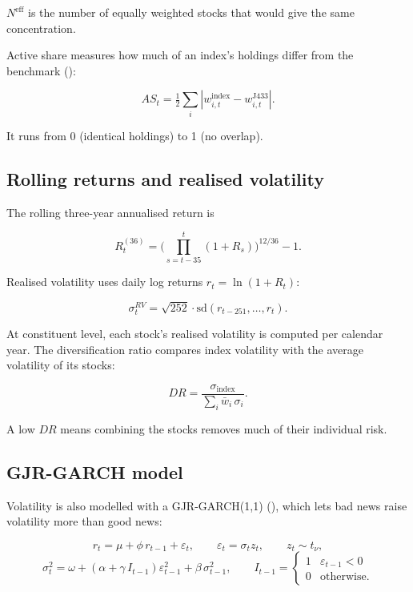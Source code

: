 \documentclass[11pt,preprint]{elsarticle}
\numberwithin{equation}{section}
\numberwithin{figure}{section}
\numberwithin{table}{section}
\begin{document}
\(N^{\text{eff}}\) is the number of equally weighted stocks that would
give the same concentration.

Active share measures how much of an index's holdings differ from the
benchmark ():

\[
AS_t = \tfrac{1}{2}\sum_{i} \left| w^{\text{index}}_{i,t} - w^{\text{J433}}_{i,t} \right|.
\]

It runs from 0 (identical holdings) to 1 (no overlap).

\subsection{Rolling returns and realised
volatility}\label{rolling-returns-and-realised-volatility}

The rolling three-year annualised return is

\[
R^{(36)}_t = \Big(\prod_{s=t-35}^{t} (1+R_s)\Big)^{12/36} - 1.
\]

Realised volatility uses daily log returns \(r_t = \ln(1+R_t)\):

\[
\sigma^{RV}_t = \sqrt{252} \cdot \text{sd}\left(r_{t-251}, \dots, r_t\right).
\]

At constituent level, each stock's realised volatility is computed per
calendar year. The diversification ratio compares index volatility with
the average volatility of its stocks:

\[
DR = \frac{\sigma_{\text{index}}}{\sum_i \bar{w}_i \, \sigma_i}.
\]

A low \(DR\) means combining the stocks removes much of their individual
risk.

\subsection{GJR-GARCH model}\label{gjr-garch-model}

Volatility is also modelled with a GJR-GARCH(1,1)
(), which lets bad news
raise volatility more than good news:

\[
r_t = \mu + \phi\, r_{t-1} + \varepsilon_t, \qquad \varepsilon_t = \sigma_t z_t, \qquad z_t \sim t_\nu,
\] \[
\sigma_t^2 = \omega + \left(\alpha + \gamma\, I_{t-1}\right)\varepsilon_{t-1}^2 + \beta\,\sigma_{t-1}^2, \qquad I_{t-1} = \begin{cases} 1 & \varepsilon_{t-1} < 0 \\ 0 & \text{otherwise.}\end{cases}
\]
\end{document}
